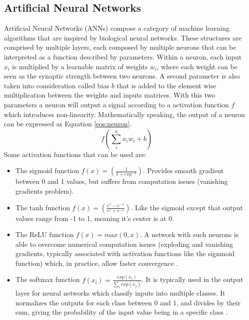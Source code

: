 \subsection{Artificial Neural Networks}
    Artificial Neural Networks (\ac{ANN}s) compose a category of machine learning algorithms that are inspired by biological neural networks. These structures are comprised by multiple layers, each composed by multiple neurons that can be interpreted as a function described by parameters.
    Within a neuron, each input $x_i$ is multiplied by a learnable matrix of weights $w_i$, where each weight can be seen as the synaptic strength between two neurons. A second parameter is also taken into consideration called bias $b$ that is added to the element wise multiplication between the weights and inputs matrices.  With this two parameters a neuron will output a signal according to a activation function $f$ which introduces non-linearity. Mathematically speaking, the output of a neuron can be expressed as Equation \ref{eqs:neuron}.
    \begin{equation}
        f(\sum_{i}^{n} x_i w_i + b)
        \label{eqs:neuron}
    \end{equation}
    Some activation functions that can be used are:
    \begin{itemize}
        \item The sigmoid function $f(x) = (\frac{1}{1+exp^{-x}})$. Provides smooth gradient between 0 and 1 values, but suffers from computation issues (vanishing gradients problem).
        \item The tanh function $f(x) = (\frac{e^x - e^{-x}}{e^x + e^{-x}}) $. Like the sigmoid except that output values range from -1 to 1, meaning it's center is at 0.  
        \item The ReLU function $f(x) = max(0, x)$. A network with such neurons is able to overcome numerical computation issues (exploding and vanishing gradients, typically associated with activation functions like the signmoid function) which, in practice, allow faster convergence \cite{?}.
        \item The softmax function $f(x_i) = \frac{exp(x_i)}{\sum_{i}^{} exp(x_j)}$. It is typically used in the output layer for neural networks which classify inputs into multiple classes. It normalizes the outputs for each class between 0 and 1, and divides by their sum, giving the probability of the input value being in a specific class \cite{?}.
    \end{itemize}
    
